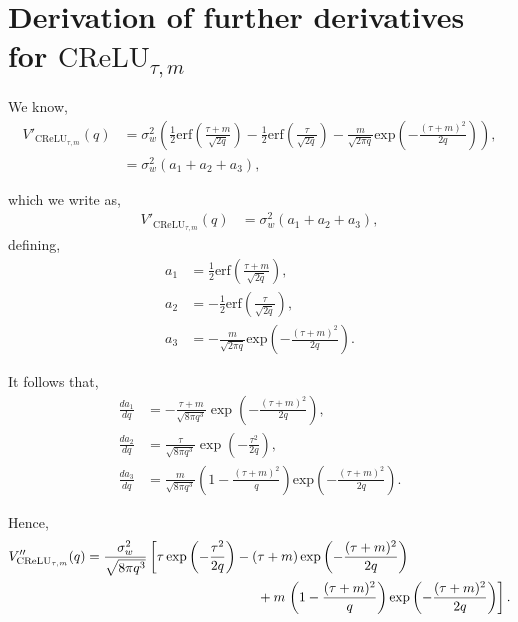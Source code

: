 \documentclass{article}
\theoremstyle{plain}
\theoremstyle{definition}
\theoremstyle{remark}
\begin{document}


\section{\texorpdfstring{Derivation of further derivatives for $\text{CReLU}_{\tau, m}$}{Derivation of further derivatives for CReLU}}{\label{appendix_further_deriv_derivations}}

We know,
\begin{align}
    V'_{\text{CReLU}_{\tau, m}}(q) &= \sigma
    _w^2\left( \frac{1}{2} \text{erf} \left( \frac{\tau+m}{\sqrt{2q}}\right)-\frac{1}{2} \text{erf} \left( \frac{\tau}{\sqrt{2q}}\right)-\frac{m}{\sqrt{2\pi q}}\text{exp}\left(- \frac{(\tau+m)^2}{2q}\right)\right), \\
    &= \sigma_w^2 \left( a_1 + a_2 + a_3\right),
\end{align}

which we write as,
\begin{align}
    V'_{\text{CReLU}_{\tau, m}}(q) &= \sigma_w^2 \left( a_1 + a_2 + a_3\right),
\end{align}
defining,
\begin{align}
    a_1 &=\frac{1}{2} \text{erf} \left( \frac{\tau+m}{\sqrt{2q}}\right), \\
    a_2 &=-\frac{1}{2} \text{erf} \left( \frac{\tau}{\sqrt{2q}}\right), \\
    a_3&= -\frac{m}{\sqrt{2\pi q}}\text{exp}\left(- \frac{(\tau+m)^2}{2q}\right).
\end{align}

It follows that,
\begin{align}
    \frac{da_1}{dq} &= -\frac{\tau+m}{\sqrt{8\pi q^3}}\exp\left({-\frac{(\tau+m)^2}{2q}}\right),\\
    \frac{da_2}{dq}&=\frac{\tau}{\sqrt{8\pi q^3}}\exp\left({-\frac{\tau^2}{2q}}\right), \\
    \frac{da_3}{dq} 
    &= \frac{m}{\sqrt{8\pi q^3}}\left( 1- \frac{(\tau+m)^2}{q}\right)\text{exp}\left(- \frac{(\tau+m)^2}{2q}\right). 
\end{align}

Hence, 
\begin{align}
    V''_{\text{CReLU}_{\tau, m}}(q) &= \frac{\sigma
    _w^2}{\sqrt{8\pi q^3}}\left[ {\tau}\exp\left({-\frac{\tau^2}{2q}}\right)-\left(\tau+m\right)\exp\left({-\frac{(\tau+m)^2}{2q}}\right) \right. \nonumber \\
    &\hspace{45mm}+{m}\left.\left( 1- \frac{(\tau+m)^2}{q}\right)\exp\left({-\frac{(\tau+m)^2}{2q}}\right)\right].
\end{align}
\end{document}
